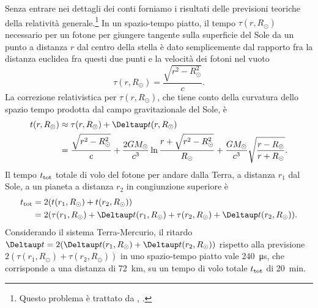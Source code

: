 Senza entrare nei dettagli dei conti forniamo i risultati delle previsioni
teoriche della relatività
generale.\footnote{Questo problema è trattato da
  \textcite[1103-1109]{misner:gravitation},
  \textcite[201-207]{weinberg:gravitation}.}
In un spazio-tempo piatto, il tempo $\tau(r,R_{\odot})$ necessario per un fotone
per giungere tangente sulla superficie del Sole da un punto a distanza $r$ dal
centro della stella è dato semplicemente dal rapporto fra la distanza euclidea
fra questi due punti e la velocità dei fotoni nel vuoto
\begin{equation}
  \tau(r, R_{\odot}) = \frac{\sqrt{r^{2} - R_{\odot}^{2}}}{c}.
\end{equation}
La correzione relativistica per $\tau(r, R_{\odot})$, che tiene conto della
curvatura dello spazio tempo prodotta dal campo gravitazionale del Sole, è
\begin{equation}
  \begin{split}
    t(r,R_{\odot}) &\approx \tau(r,R_{\odot}) + \var t(r,R_{\odot}) \\
    &= \frac{\sqrt{r^{2} - R_{\odot}^{2}}}{c} + \frac{2GM_{\odot}}{c^{3}} \ln
    \frac{r + \sqrt{r^{2} - R_{\odot}^{2}}}{R_{\odot}} +
    \frac{GM_{\odot}}{c^{3}} \sqrt{\frac{r - R_{\odot}}{r + R_{\odot}}}.
  \end{split}
\end{equation}
Il tempo $t_{\textup{tot}}$ totale di volo del fotone per andare dalla Terra, a
distanza $r_{1}$ dal Sole, a un pianeta a distanza $r_{2}$ in congiunzione
superiore è
\begin{equation}
  \begin{split}
    t_{\textup{tot}} &= 2(t(r_{1},R_{\odot}) + t(r_{2},R_{\odot})) \\
    &= 2(\tau(r_{1},R_{\odot}) + \var t(r_{1},R_{\odot}) +
    \tau(r_{2},R_{\odot}) + \var t(r_{2},R_{\odot})).
  \end{split}
\end{equation}
Considerando il sistema Terra-Mercurio, il ritardo
$\var t = 2(\var t(r_{1},R_{\odot}) + \var t(r_{2},R_{\odot}))$ rispetto alla
previsione $2(\tau(r_{1},R_{\odot}) + \tau(r_{2},R_{\odot}))$ in uno
spazio-tempo piatto vale \SI{240}{\micro\second}, che corrisponde a una distanza
di \SI{72}{\kilo\metre}, su un tempo di volo totale $t_{\textup{tot}}$ di
\SI{20}{\minute}.

